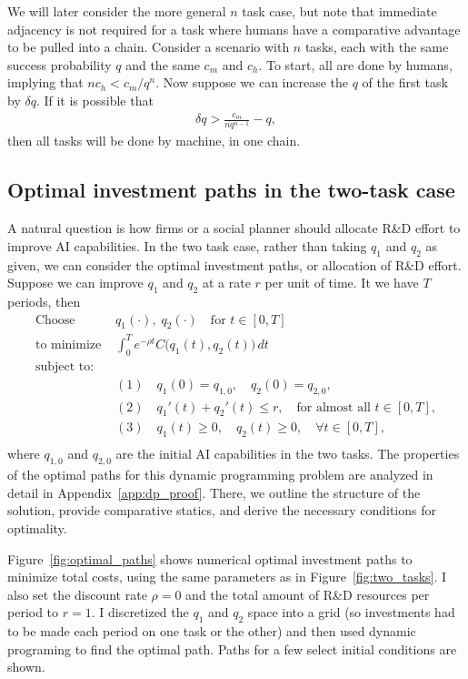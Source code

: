\documentclass{article}
\theoremstyle{plain}
\theoremstyle{plain}
\begin{document}
We will later consider the more general $n$ task case, but note that immediate adjacency is not required for a task where humans have a comparative advantage to be pulled into a chain.
Consider a scenario with $n$ tasks, each with the same success probability $q$ and the same $c_m$ and $c_h$.
To start, all are done by humans, implying that $n c_h < c_m / q^n$.
Now suppose we can increase the $q$ of the first task by $\delta q$. 
If it is possible that  
\begin{align}
  \delta q > \frac{c_m}{n q^{n-1}} - q,
\end{align} 
then all tasks will be done by machine, in one chain.

\subsection{Optimal investment paths in the two-task case}
A natural question is how firms or a social planner should allocate R\&D effort to improve AI capabilities.
In the two task case, rather than taking $q_1$ and $q_2$ as given, we can consider the optimal investment paths, or allocation of R\&D effort.
Suppose we can improve $q_1$ and $q_2$ at a rate $r$ per unit of time.
It we have $T$ periods, then 
\[
\begin{aligned}
\text{Choose } &q_1(\cdot), \; q_2(\cdot) \quad \text{for } t \in [0, T]\\
\text{to minimize } &
   \int_{0}^{T}
   e^{-\rho t} C\bigl(q_1(t), q_2(t)\bigr) \, dt \\[1em]
\text{subject to:} & \\[-1em]
&(1)\quad q_1(0) = q_{1,0}, \quad q_2(0) = q_{2,0}, \\[6pt]
&(2)\quad q_1'(t) + q_2'(t) \le r, \quad \text{for almost all } t \in [0, T], \\[6pt]
&(3)\quad q_1(t) \geq 0, \quad q_2(t) \geq 0, \quad \forall t \in [0, T], \\[6pt]
\end{aligned}
\label{eq:dp_problem}
\]
where $q_{1,0}$ and $q_{2,0}$ are the initial AI capabilities in the two tasks.
The properties of the optimal paths for this dynamic programming problem are analyzed in detail in Appendix~\ref{app:dp_proof}. 
There, we outline the structure of the solution, provide comparative statics, and derive the necessary conditions for optimality.

Figure~\ref{fig:optimal_paths} shows numerical optimal investment paths to minimize total costs, using the same parameters as in Figure~\ref{fig:two_tasks}.
I also set the discount rate $\rho = 0$ and the total amount of R\&D resources per period  to $r = 1$.
I discretized the $q_1$ and $q_2$ space into a grid (so investments had to be made each period on one task or the other) and then used dynamic programing to find the optimal path.
Paths for a few select initial conditions are shown.
\end{document}
